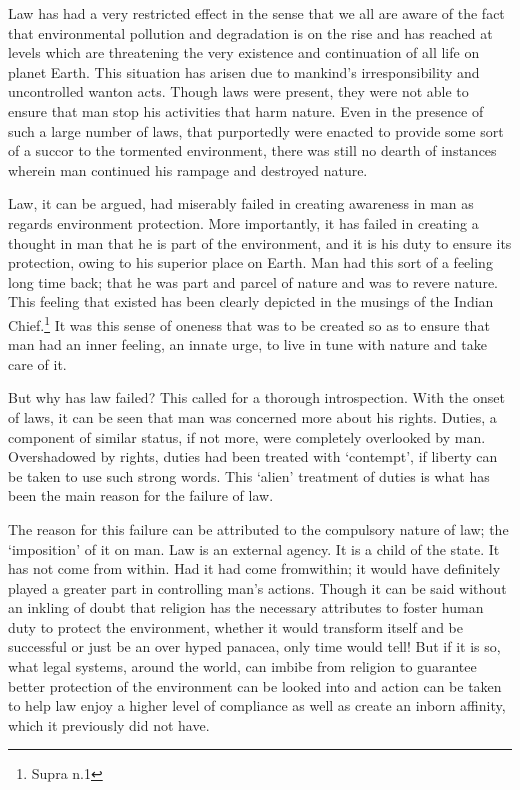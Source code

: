 \begin{multicols}{2}
\noi
Law has had a very restricted effect in the sense that we all are aware of the fact that
environmental pollution and degradation is on the rise and has reached at levels which are
threatening the very existence and continuation of all life on planet Earth. This situation has
arisen due to mankind’s irresponsibility and uncontrolled wanton acts. Though laws were
present, they were not able to ensure that man stop his activities that harm nature. Even in the
presence of such a large number of laws, that purportedly were enacted to provide some sort
of a succor to the tormented environment, there was still no dearth of instances wherein man
continued his rampage and destroyed nature.

\vspace{-.1cm}

\noi
Law, it can be argued, had miserably failed in creating awareness in man as regards
environment protection. More importantly, it has failed in creating a thought in man that he is
part of the environment, and it is his duty to ensure its protection, owing to his superior place
on Earth. Man had this sort of a feeling long time back; that he was part and parcel of nature
and was to revere nature. This feeling that existed has been clearly depicted in the musings of
the Indian Chief.\footnote{Supra n.1} It was this sense of oneness that was to be created so as to ensure that man
had an inner feeling, an innate urge, to live in tune with nature and take care of it.

\vspace{-.1cm}

\noi
But why has law failed? This called for a thorough introspection. With the onset of laws, it
can be seen that man was concerned more about his rights. Duties, a component of similar
status, if not more, were completely overlooked by man. Overshadowed by rights, duties had
been treated with ‘contempt’, if liberty can be taken to use such strong words. This ‘alien’
treatment of duties is what has been the main reason for the failure of law.

\vspace{-.1cm}

\noi
The reason for this failure can be attributed to the compulsory nature of law; the ‘imposition’
of it on man. Law is an external agency. It is a child of the state. It has not come from within.
Had it had come fromwithin; it would have definitely played a greater part in controlling man’s
actions. Though it can be said without an inkling of doubt that religion has the necessary
attributes to foster human duty to protect the environment, whether it would transform itself
and be successful or just be an over hyped panacea, only time would tell! But if it is so, what
legal systems, around the world, can imbibe from religion to guarantee better protection of the
environment can be looked into and action can be taken to help law enjoy a higher level of
compliance as well as create an inborn affinity, which it previously did not have.


\end{multicols}
